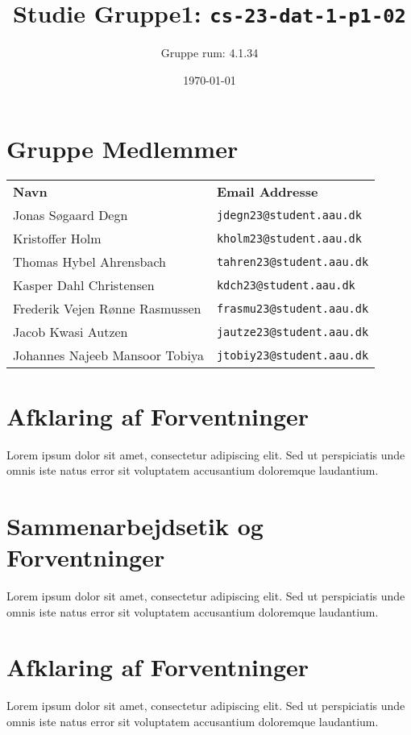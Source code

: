 \documentclass{article}
\begin{document}
\title{Studie Gruppe1: \texttt{cs-23-dat-1-p1-02}}
\author{Gruppe rum: 4.1.34}
\date{\today}
\maketitle

\section*{Gruppe Medlemmer}
\begin{tabular}{ll}
\textbf{Navn} & \textbf{Email Addresse} \\
Jonas Søgaard Degn & \texttt{jdegn23@student.aau.dk} \\
Kristoffer Holm & \texttt{kholm23@student.aau.dk} \\
Thomas Hybel Ahrensbach & \texttt{tahren23@student.aau.dk} \\
Kasper Dahl Christensen & \texttt{kdch23@student.aau.dk} \\
Frederik Vejen Rønne Rasmussen & \texttt{frasmu23@student.aau.dk} \\
Jacob Kwasi Autzen & \texttt{jautze23@student.aau.dk} \\
Johannes Najeeb Mansoor Tobiya & \texttt{jtobiy23@student.aau.dk} \\
\end{tabular}



\section*{Afklaring af Forventninger}
Lorem ipsum dolor sit amet, consectetur adipiscing elit. Sed ut perspiciatis unde omnis iste natus error sit voluptatem accusantium doloremque laudantium.


\section*{Sammenarbejdsetik og Forventninger}
Lorem ipsum dolor sit amet, consectetur adipiscing elit. Sed ut perspiciatis unde omnis iste natus error sit voluptatem accusantium doloremque laudantium.


\section*{Afklaring af Forventninger}
Lorem ipsum dolor sit amet, consectetur adipiscing elit. Sed ut perspiciatis unde omnis iste natus error sit voluptatem accusantium doloremque laudantium.
\end{document}
